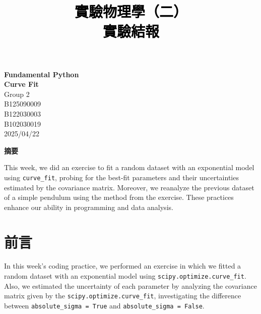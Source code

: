 \documentclass[12pt,a4paper]{article}
\title{\vspace{-0.5cm}
       {\bf \textcolor{black}{{\LARGE 
       \begin{CJK}{UTF8}{bkai}
       實驗物理學（二）\\
       \vspace{6pt}
        實驗結報\\
       \end{CJK}
       }}
       }
       }
\author{}
\date{}
\begin{document}
\begin{CJK}{UTF8}{bkai}

\maketitle
\thispagestyle{empty}

\vspace{10cm}
\begin{center}
{\bf \LARGE \vspace{-11cm} Fundamental Python\\
\vspace{0.25cm} Curve Fit}\\
\vspace{13cm}
{\large Group 2}\\ \vspace{12pt}
{\large {} B125090009}\\ \vspace{6pt}
{\large {}  B122030003}\\ \vspace{6pt}
{\large {} B102030019}\\ \vspace{12pt}
{\large 2025/04/22}\\
\end{center}

\clearpage
\vspace{1cm}
\begin{center}
{\large\bf\sc 摘要}
\end{center}

\noindent 

This week, we did an exercise to fit a random dataset with an exponential model using \texttt{curve\_fit}, probing for the best-fit parameters and their uncertainties estimated by the covariance matrix. Moreover, we reanalyze the previous dataset of a simple pendulum using the method from the exercise. These practices enhance our ability in programming and data analysis.

\section{前言}
\hfill

In this week's coding practice, we performed an exercise in which we fitted a random dataset with an exponential model using \texttt{scipy.optimize.curve\_fit}. Also, we estimated the uncertainty of each parameter by analyzing the covariance matrix given by the \texttt{scipy.optimize.curve\_fit}, investigating the difference between \texttt{absolute\_sigma = True} and \texttt{absolute\_sigma = False}.


\end{CJK}
\end{document}
